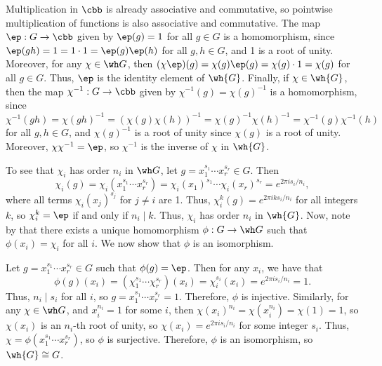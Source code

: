 \begin{solenum}[spsol]
    \item Multiplication in $\cbb$ is already associative and commutative, so pointwise multiplication of functions is also associative and commutative.
	The map $\ep : G \to \cbb$ given by $\ep(g) = 1$ for all $g \in G$ is a homomorphism, since $\ep(gh) = 1 = 1 \cdot 1 = \ep(g)\ep(h)$ for all $g, h \in G$, and 1 is a root of unity.
	Moreover, for any $\chi \in \wh G$, then $(\chi\ep)(g) = \chi(g)\ep(g) = \chi(g) \cdot 1 = \chi(g)$ for all $g \in G$.
	Thus, $\ep$ is the identity element of $\wh{G}$.
	Finally, if $\chi \in \wh{G}$, then the map $\chi^{-1} : G \to \cbb$ given by $\chi^{-1}(g) = \chi(g)^{-1}$ is a homomorphism, since $\chi^{-1}(gh) = \chi(gh)^{-1} = (\chi(g)\chi(h))^{-1} = \chi(g)^{-1}\chi(h)^{-1} = \chi^{-1}(g)\chi^{-1}(h)$ for all $g, h \in G$, and $\chi(g)^{-1}$ is a root of unity since $\chi(g)$ is a root of unity.
	Moreover, $\chi\chi^{-1} = \ep$, so $\chi^{-1}$ is the inverse of $\chi$ in $\wh{G}$.
    \item To see that $\chi_i$ has order $n_i$ in $\wh G$, let $g = x_1^{s_1} \cdots x_r^{s_r} \in G$.
	Then
    \[
    	\chi_i(g) = \chi_i(x_1^{s_1} \cdots x_r^{s_r}) = \chi_i(x_1)^{s_1} \cdots \chi_i(x_r)^{s_r} = e^{2\pi i s_i / n_i},
    \]
    where all terms $\chi_i(x_j)^{s_j}$ for $j \neq i$ are 1.
	Thus, $\chi_i^k(g) = e^{2\pi i k s_i / n_i}$ for all integers $k$, so $\chi_i^k = \ep$ if and only if $n_i \mid k$.
	Thus, $\chi_i$ has order $n_i$ in $\wh{G}$.
	Now, note by  that there exists a unique homomorphism $\phi : G \to \wh G$ such that $\phi(x_i) = \chi_i$ for all $i$.
	We now show that $\phi$ is an isomorphism.

    Let $g = x_1^{s_1} \cdots x_r^{s_r} \in G$ such that $\phi(g) = \ep$.
	Then for any $x_i$, we have that
    \[
    	\phi(g)(x_i) = (\chi_1^{s_1} \cdots \chi_r^{s_r})(x_i) = \chi_i^{s_i}(x_i) = e^{2\pi i s_i / n_i} = 1.
    \]
    Thus, $n_i \mid s_i$ for all $i$, so $g = x_1^{s_1} \cdots x_r^{s_r} = 1$.
	Therefore, $\phi$ is injective.
	Similarly, for any $\chi \in \wh G$, and $x_i^{n_i} = 1$ for some $i$, then $\chi(x_i)^{n_i} = \chi(x_i^{n_i}) = \chi(1) = 1$, so $\chi(x_i)$ is an $n_i$-th root of unity, so $\chi(x_i) = e^{2\pi i s_i / n_i}$ for some integer $s_i$.
	Thus, $\chi = \phi(x_1^{s_1} \cdots x_r^{s_r})$, so $\phi$ is surjective.
	Therefore, $\phi$ is an isomorphism, so $\wh{G} \cong G$.
\end{solenum}

